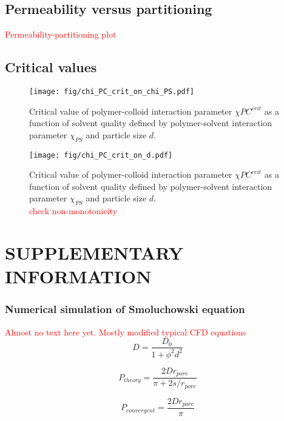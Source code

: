\documentclass[12pt, a4paper]{article}
\newcommand\todo[1]{\textcolor{red}{#1}}
\begin{document}
\subsection{Permeability versus partitioning}
\todo{Permeability-partitioning plot}

\subsection{Critical values}
\begin{figure}
    \centering
    \texttt{[image: fig/chi\_PC\_crit\_on\_chi\_PS.pdf]}
    \caption{
        Critical value of polymer-colloid interaction parameter $\chi{PC}^{crit}$ as a function of solvent quality defined by polymer-solvent interaction parameter $\chi_{PS}$ and particle size $d$.
    }
    \label{fig:chi_pc_crit_on_chi_ps}
\end{figure}

\begin{figure}
    \centering
    \texttt{[image: fig/chi\_PC\_crit\_on\_d.pdf]}
    \caption{
        Critical value of polymer-colloid interaction parameter $\chi{PC}^{crit}$ as a function of solvent quality defined by polymer-solvent interaction parameter $\chi_{PS}$ and particle size $d$.
        \\
        \todo{check non-monotonicity}
    }
    \label{fig:chi_pc_crit_on_d}
\end{figure}


\section*{SUPPLEMENTARY INFORMATION}
\subsubsection{Numerical simulation of Smoluchowski equation}
\todo{Almost no text here yet. Mostly modified typical CFD equations}
\begin{equation}
    D = \frac{D_{0}}{1+\phi^2 d^2}
\end{equation}

\begin{equation}
    P_{theory} = \frac{2 D r_{pore}}{\pi + 2 s / r_{pore}}
\end{equation}

\begin{equation}
    P_{convergent} = \frac{2 D r_{pore}}{\pi}
\end{equation}
\end{document}
